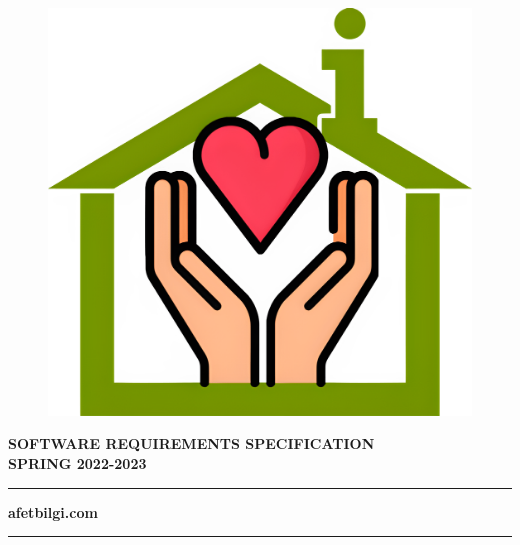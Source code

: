 \begin{titlepage}
\begin{center}
  \begin{figure}[ht]
    \centering
    \includegraphics[width=.5\linewidth]{img/afetbilgi.jpg}
  \end{figure}

  \vspace{16pt}
  \large{
    \textbf{SOFTWARE REQUIREMENTS SPECIFICATION}
  } \\
  \large{
    \textbf{SPRING 2022-2023}
  }

  \rule{12cm}{1pt}

  \large{\textbf{afetbilgi.com}}
  \vspace{-7pt}

  \rule{12cm}{1pt}

  \vspace{48pt}
  \begin{minipage}{.45\textwidth}
    \centering
  \end{minipage}
  \hfill
  \begin{minipage}{.45\textwidth}
    \centering
  \end{minipage}
  
  \end{center}
\end{titlepage}
  